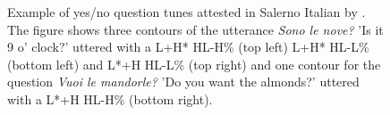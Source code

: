 \documentclass[output=paper,colorlinks,citecolor=brown]{langscibook}
\begin{document}
\begin{figure}
  \caption{Example of yes/no question tunes attested in Salerno Italian by \citep{orrico19}. The figure shows three contours of the utterance \textit{Sono le nove?} 'Is it 9 o' clock?' uttered with a L+H* HL-H\% (top left) L+H* HL-L\% (bottom left) and L*+H HL-L\% (top right) and one contour for the question \textit{Vuoi le mandorle?} 'Do you want the almonds?' uttered with a L*+H HL-H\% (bottom right).}
  \label{fig1}
\end{figure}
\end{document}
